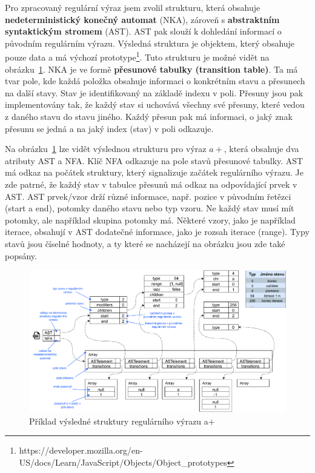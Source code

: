 Pro zpracovaný regulární výraz jsem zvolil strukturu, která obsahuje \textbf{nedeterministický konečný automat} (NKA), zároveň s \textbf{abstraktním syntaktickým stromem} (AST).
AST pak slouží k dohledání informací o původním regulárním výrazu. 
Výsledná struktura je objektem, který obsahuje pouze data a má výchozí prototype\footnote{https://developer.mozilla.org/en-US/docs/Learn/JavaScript/Objects/Object\_prototypes}.
Tuto strukturu je možné vidět na obrázku~\ref{fig:JSONex}.
NKA je ve formě \textbf{přesunové tabulky (transition table)}. 
Ta má tvar pole, kde každá položka obsahuje informaci o konkrétním stavu a přesunech na další stavy.
Stav je identifikovaný na základě indexu v poli. 
Přesuny jsou pak implementovány tak, že každý stav si uchovává všechny své přesuny, které vedou z daného stavu do stavu jiného.
Každý přesun pak má informaci, o jaký znak přesunu se jedná a na jaký index (stav) v poli odkazuje. 

Na obrázku~\ref{fig:JSONex} lze vidět výslednou strukturu pro výraz $a+$, která obsahuje dva atributy AST a NFA.
Klíč NFA odkazuje na pole stavů přesunové tabulky. 
AST má odkaz na počátek struktury, který signalizuje začátek regulárního výrazu.
Je zde patrné, že každý stav v tabulce přesunů má odkaz na odpovídající prvek v AST. 
AST prvek/vzor drží různé informace, např. pozice v původním řetězci (start a end), 
potomky daného stavu nebo typ vzoru. 
Ne každý stav musí mít potomky, ale například skupina potomky má.
Některé vzory, jako je například iterace, obsahují v AST dodatečné informace, jako je rozsah iterace (range).
Typy stavů jsou číselné hodnoty, a ty které se nacházejí na obrázku jsou zde také popsány.

\begin{figure}[!h]
	\centering
	\includegraphics[width=1\textwidth]{Figures/BP-JSON.pdf}
	\caption{Příklad výsledné struktury regulárního výrazu a+}
	\label{fig:JSONex}
\end{figure}

